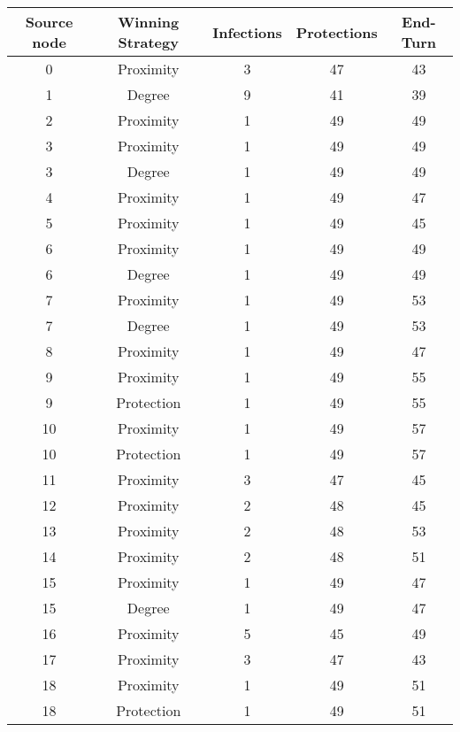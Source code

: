\documentclass[results.tex]{subfiles}
\begin{document}
\begin{center}
  \begin{tabular}{| c || c | c | c | c |}
    \hline
    {\bfseries Source node} & {\bfseries Winning Strategy} & {\bfseries Infections} & {\bfseries Protections} & {\bfseries End-Turn} \\  %
    \hline\hline
    0 & Proximity & 3 & 47 & 43 \\ 
    \hline
    1 & Degree & 9 & 41 & 39 \\ 
    \hline
    2 & Proximity & 1 & 49 & 49 \\ 
    \hline
    3 & Proximity & 1 & 49 & 49 \\ 
    \hline
    3 & Degree & 1 & 49 & 49 \\ 
    \hline
    4 & Proximity & 1 & 49 & 47 \\ 
    \hline
    5 & Proximity & 1 & 49 & 45 \\ 
    \hline
    6 & Proximity & 1 & 49 & 49 \\ 
    \hline
    6 & Degree & 1 & 49 & 49 \\ 
    \hline
    7 & Proximity & 1 & 49 & 53 \\ 
    \hline
    7 & Degree & 1 & 49 & 53 \\ 
    \hline
    8 & Proximity & 1 & 49 & 47 \\ 
    \hline
    9 & Proximity & 1 & 49 & 55 \\ 
    \hline
    9 & Protection & 1 & 49 & 55 \\ 
    \hline
    10 & Proximity & 1 & 49 & 57 \\ 
    \hline
    10 & Protection & 1 & 49 & 57 \\ 
    \hline
    11 & Proximity & 3 & 47 & 45 \\ 
    \hline
    12 & Proximity & 2 & 48 & 45 \\ 
    \hline
    13 & Proximity & 2 & 48 & 53 \\ 
    \hline
    14 & Proximity & 2 & 48 & 51 \\ 
    \hline
    15 & Proximity & 1 & 49 & 47 \\ 
    \hline
    15 & Degree & 1 & 49 & 47 \\ 
    \hline
    16 & Proximity & 5 & 45 & 49 \\ 
    \hline
    17 & Proximity & 3 & 47 & 43 \\ 
    \hline
    18 & Proximity & 1 & 49 & 51 \\ 
    \hline
    18 & Protection & 1 & 49 & 51 \\ 

\end{tabular}
\end{center}
\end{document}
